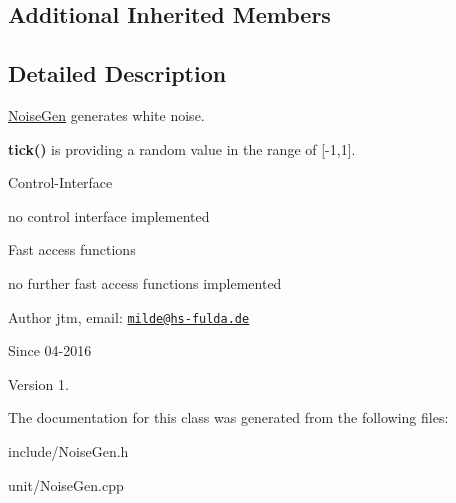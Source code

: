 \subsection*{Additional Inherited Members}


\subsection{Detailed Description}
\hyperlink{classunit_1_1NoiseGen}{Noise\-Gen} generates white noise.


\begin{DoxyItemize}
\item {\bfseries tick()} is providing a random value in the range of \mbox{[}-\/1,1\mbox{]}.
\end{DoxyItemize}

Control-\/\-Interface
\begin{DoxyItemize}
\item no control interface implemented
\end{DoxyItemize}

Fast access functions
\begin{DoxyItemize}
\item no further fast access functions implemented
\end{DoxyItemize}

\begin{DoxyAuthor}{Author}
jtm, email\-:  \href{mailto:milde@hs-fulda.de}{\tt milde@hs-\/fulda.\-de} 
\end{DoxyAuthor}
\begin{DoxySince}{Since}
04-\/2016 
\end{DoxySince}
\begin{DoxyVersion}{Version}
1. 
\end{DoxyVersion}


The documentation for this class was generated from the following files\-:\begin{DoxyCompactItemize}
\item 
include/Noise\-Gen.\-h\item 
unit/Noise\-Gen.\-cpp\end{DoxyCompactItemize}
